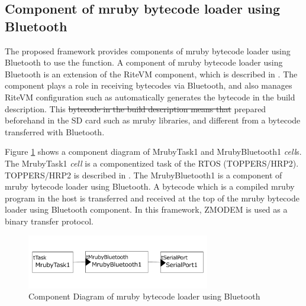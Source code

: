 \documentclass[conference,compsoc]{IEEEtran}
\providecommand{\DIFadd}[1]{{\protect\color{blue}\uwave{#1}}} %
\providecommand{\DIFdel}[1]{{\protect\color{red}\sout{#1}}}                      %
\providecommand{\DIFaddbegin}{} %
\providecommand{\DIFaddend}{} %
\providecommand{\DIFdelbegin}{} %
\providecommand{\DIFdelend}{} %
\begin{document}
\subsection{Component of mruby bytecode loader using Bluetooth}
The proposed framework provides components of mruby bytecode loader using Bluetooth to use the function.
A component of mruby bytecode loader using Bluetooth is an extension of the RiteVM component, which is described in \cite{7153813}.
The component plays a role in receiving bytecodes via Bluetooth, and also manages RiteVM configuration such as automatically generates the bytecode in the build description.
This \DIFdelbegin \DIFdel{bytecode in the build description means that }\DIFdelend \DIFaddbegin \DIFadd{generated bytecode is }\DIFaddend prepared beforehand in the SD card such as mruby libraries, and different from a bytecode transferred with Bluetooth.

Figure \ref{fig:component_bluetooth} shows a component diagram of MrubyTask1 and MrubyBluetooth1 {\it cell}s.
The MrubyTask1 {\it cell} is a componentized task of the RTOS (TOPPERS/HRP2).
TOPPERS/HRP2 is described in \cite{6913200}.
The MrubyBluetooth1 is a component of mruby bytecode loader using Bluetooth.
A bytecode which is a compiled mruby program in the host is transferred and received at the top of the mruby bytecode loader using Bluetooth component.
In this framework, ZMODEM \cite{forsberg1988zmodem} is used as a binary transfer protocol.

\begin{figure}[t]
    \centering
    \includegraphics[width=8cm,clip]{figure/component_bluetooth.pdf}
    \caption{Component Diagram of mruby bytecode loader using Bluetooth}
    \label{fig:component_bluetooth}
\end{figure}
\end{document}

